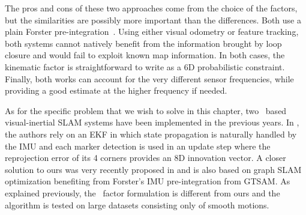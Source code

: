 The pros and cons of these two approaches come from the choice of the factors, but the similarities are possibly more important than the differences.
Both use a plain Forster pre-integration~\cite{forster2017-TRO}. 
Using either visual odometry or feature tracking, both systems cannot natively benefit from the information brought by loop closure and would fail 
to exploit known map information.
In both cases, the kinematic factor is straightforward to write as a 6D probabilistic constraint.
Finally, both works can account for the very different sensor frequencies, while providing a good estimate at the higher frequency if needed.

As for the specific problem that we wish to solve in this chapter, two \apriltag\ based visual-inertial SLAM systems have been implemented in the previous years. 
In \cite{neunert2016open}, the authors rely on an EKF in which state propagation is naturally 
handled by the IMU and each marker detection is used in an update step where the reprojection error of its 4 corners provides an 8D innovation vector. 
A closer solution to ours was very recently proposed in \cite{he2019lightweight} and is also based on graph SLAM optimization benefiting from 
Forster's IMU pre-integration from GTSAM. As explained previously, the \apriltag\ factor formulation is different from ours and the algorithm is tested 
on large datasets consisting only of smooth motions.



